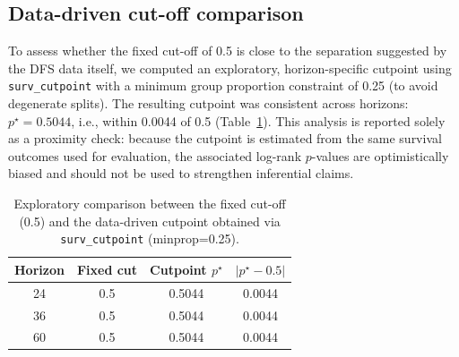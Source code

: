 \subsection{Data-driven cut-off comparison}
\label{sec:tcga_cutpoint_exploratory}

To assess whether the fixed cut-off of 0.5 is close to the separation suggested by the DFS data itself, we computed an exploratory, horizon-specific cutpoint using \texttt{surv\_cutpoint} with a minimum group proportion constraint of 0.25 (to avoid degenerate splits). The resulting cutpoint was consistent across horizons: $p^\star = 0.5044$, i.e., within 0.0044 of 0.5 (Table~\ref{tab:tcga_cutpoint}).
This analysis is reported solely as a proximity check: because the cutpoint is estimated from the same survival outcomes used for evaluation, the associated log-rank $p$-values are optimistically biased and should not be used to strengthen inferential claims.

\begin{table}[H]
\centering
\caption{Exploratory comparison between the fixed cut-off (0.5) and the data-driven cutpoint obtained via \texttt{surv\_cutpoint} (minprop=0.25).}
\label{tab:tcga_cutpoint}
\small
\setlength{\tabcolsep}{4pt}
\begin{tabular}{cccc}
\hline
Horizon & Fixed cut & Cutpoint $p^\star$ & $|p^\star - 0.5|$ \\
\hline
24 & 0.5 & 0.5044 & 0.0044 \\
36 & 0.5 & 0.5044 & 0.0044 \\
60 & 0.5 & 0.5044 & 0.0044 \\
\hline
\end{tabular}
\end{table}

